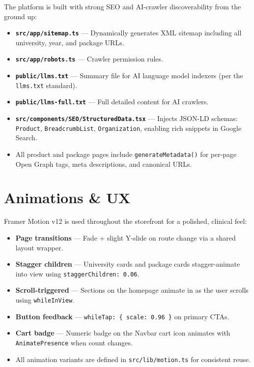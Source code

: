 \documentclass[12pt, a4paper]{article}
\begin{document}
The platform is built with strong SEO and AI-crawler discoverability from the ground up:

\begin{itemize}[leftmargin=*]
  \item \textbf{\texttt{src/app/sitemap.ts}} — Dynamically generates XML sitemap including all university, year, and package URLs.
  \item \textbf{\texttt{src/app/robots.ts}} — Crawler permission rules.
  \item \textbf{\texttt{public/llms.txt}} — Summary file for AI language model indexers (per the \texttt{llms.txt} standard).
  \item \textbf{\texttt{public/llms-full.txt}} — Full detailed content for AI crawlers.
  \item \textbf{\texttt{src/components/SEO/StructuredData.tsx}} — Injects JSON-LD schemas: \texttt{Product}, \texttt{BreadcrumbList}, \texttt{Organization}, enabling rich snippets in Google Search.
  \item All product and package pages include \texttt{generateMetadata()} for per-page Open Graph tags, meta descriptions, and canonical URLs.
\end{itemize}

\section{Animations \& UX}

Framer Motion v12 is used throughout the storefront for a polished, clinical feel:

\begin{itemize}[leftmargin=*]
  \item \textbf{Page transitions} — Fade + slight Y-slide on route change via a shared layout wrapper.
  \item \textbf{Stagger children} — University cards and package cards stagger-animate into view using \texttt{staggerChildren: 0.06}.
  \item \textbf{Scroll-triggered} — Sections on the homepage animate in as the user scrolls using \texttt{whileInView}.
  \item \textbf{Button feedback} — \texttt{whileTap: \{ scale: 0.96 \}} on primary CTAs.
  \item \textbf{Cart badge} — Numeric badge on the Navbar cart icon animates with \texttt{AnimatePresence} when count changes.
  \item All animation variants are defined in \texttt{src/lib/motion.ts} for consistent reuse.
\end{itemize}
\end{document}

